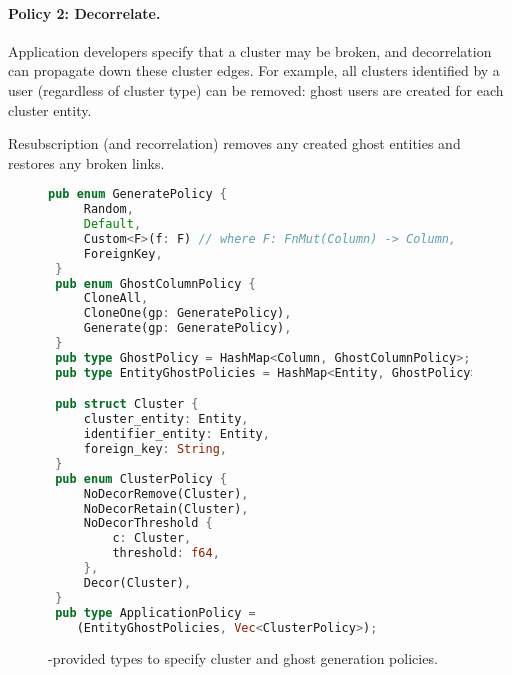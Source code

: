 \paragraph{Policy 2: Decorrelate.}

Application developers specify that a cluster may be broken, and decorrelation can propagate down
these cluster edges.
For example, all clusters identified by a user (regardless of cluster type) can be removed: ghost
users are created for each cluster entity.

Resubscription (and recorrelation) removes any created ghost entities and restores any broken links.


\begin{figure}
\begin{lstlisting}[language=Rust]
 pub enum GeneratePolicy {
     Random,
     Default,
     Custom<F>(f: F) // where F: FnMut(Column) -> Column,
     ForeignKey, 
 }
 pub enum GhostColumnPolicy {
     CloneAll,
     CloneOne(gp: GeneratePolicy),
     Generate(gp: GeneratePolicy),
 }
 pub type GhostPolicy = HashMap<Column, GhostColumnPolicy>;
 pub type EntityGhostPolicies = HashMap<Entity, GhostPolicy>;

 pub struct Cluster {
     cluster_entity: Entity,
     identifier_entity: Entity,
     foreign_key: String,
 }
 pub enum ClusterPolicy {
     NoDecorRemove(Cluster),
     NoDecorRetain(Cluster),
     NoDecorThreshold {
         c: Cluster,
         threshold: f64,
     },
     Decor(Cluster),
 }
 pub type ApplicationPolicy = 
    (EntityGhostPolicies, Vec<ClusterPolicy>);
\end{lstlisting}
    \caption{\sys{}-provided types to specify cluster and ghost generation policies.}
\end{figure}


